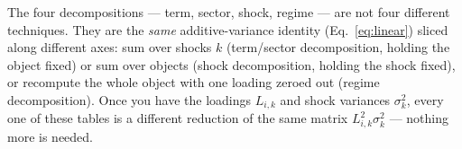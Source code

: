 \documentclass[12pt]{article}
\begin{document}
\begin{keyresult}
The four decompositions — term, sector, shock, regime — are not four different techniques. They are
the \emph{same} additive-variance identity (Eq.~\ref{eq:linear}) sliced along different axes: sum
over shocks $k$ (term/sector decomposition, holding the object fixed) or sum over objects
(shock decomposition, holding the shock fixed), or recompute the whole object with one loading
zeroed out (regime decomposition). Once you have the loadings $L_{i,k}$ and shock variances
$\sigma_k^2$, every one of these tables is a different reduction of the same matrix
$L_{i,k}^2\sigma_k^2$ — nothing more is needed.
\end{keyresult}
\end{document}
